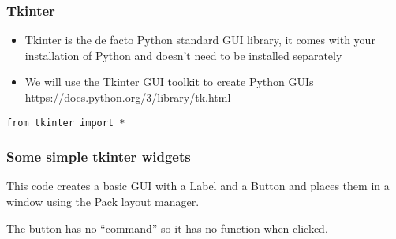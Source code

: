 \begin{frame}[fragile] \frametitle{Tkinter}
\begin{itemize}
\item Tkinter is the de facto Python standard GUI library, it comes with your installation of Python and doesn't need to be installed separately
\item We will use the Tkinter GUI toolkit to create Python GUIs \\
https://docs.python.org/3/library/tk.html 
\end{itemize}
\begin{lstlisting}
from tkinter import *
\end{lstlisting}
\end{frame}


\begin{frame}[fragile] \frametitle{Some simple tkinter widgets}

\hfill
{}
This code creates a basic GUI with a Label and a Button and places them in a window using the Pack layout manager.

The button has no ``command'' so it has no function when clicked.

\end{frame}


